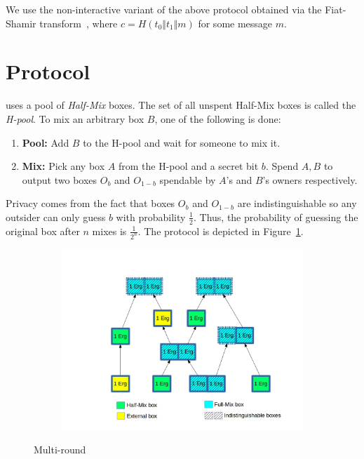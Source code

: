 \documentclass[runningheads]{llncs}
\begin{document}
We use the non-interactive variant of the above protocol obtained via the Fiat-Shamir transform~\cite{fiatshamir}, where $c = H(t_0 \Vert t_1\Vert m)$ for some message $m$. 

\section{\algname Protocol}

\algname uses a pool of {\em Half-Mix} boxes. The set of all unspent Half-Mix boxes is called the {\em H-pool}. To mix an arbitrary box $B$, one of the following is done:
\begin{enumerate}
	\item \textbf{Pool:} Add $B$ to the H-pool and wait for someone to mix it.
	\item \textbf{Mix:} Pick any box $A$ from the H-pool and a secret bit $b$. Spend $A, B$ to 
	output two boxes $O_b$ and $O_{1-b}$ spendable by $A$'s and $B$'s owners respectively.
\end{enumerate}

Privacy comes from the fact that boxes $O_b$ and $O_{1-b}$ are indistinguishable so any outsider can only guess $b$ with probability $\frac{1}{2}$. Thus, the probability of guessing the original box after $n$ mixes is $\frac{1}{2^n}$. The protocol is depicted in Figure~\ref{fig:mixname}. 

\begin{figure}[h]
	\centering
	\begin{subfigure}{.7\textwidth}
		\centering
		\includegraphics[width=\linewidth]{ZeroJoin}
	\end{subfigure}
	\caption{Multi-round \algname}
\label{fig:mixname}
\end{figure}
\end{document}
